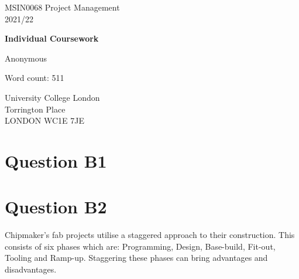 \documentclass[11pt]{article}
\begin{document}
\begin{titlepage}
    \begin{center}
        \vspace*{1cm}
             
        MSIN0068 Project Management\\
        2021/22
 
        \vspace{1.5cm}

        {\LARGE \textbf{Individual Coursework} \par}
             
        \vspace{1.5cm}
 
        Anonymous
        
        \vfill

        Word count: 511

        \vspace{1.5cm}

        University College London\\
        Torrington Place\\
        LONDON WC1E 7JE
             
    \end{center}
 \end{titlepage}
\newpage
\section*{Question B1}
\section*{Question B2}
Chipmaker's fab projects utilise a staggered approach to their construction. This consists of six phases which are: Programming, Design, Base-build, Fit-out, Tooling and Ramp-up. Staggering these phases can bring advantages and disadvantages. 
\end{document}
